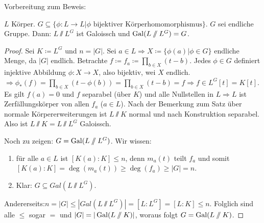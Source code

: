 \documentclass[12pt,a4paper]{scrartcl}
\begin{document}
\noindent Vorbereitung zum Beweis:
\begin{satz}\label{thm:22.2}
	$L$ Körper. $G\subseteq \{\phi\colon L\to L|\phi\text{ bijektiver Körperhomomorphismus}\}$. $G$ sei endliche Gruppe. Dann: $L\sslash L^G$ ist Galoissch und $\operatorname{Gal}(L\sslash L^G) = G$. 
\end{satz}
\begin{proof}
	Sei $K\coloneqq L^G$ und $n = |G|$. Sei $a\in L\Rightarrow X\coloneqq\{\phi(a)|\phi\in G\}$ endliche Menge, da $|G|$ endlich. Betrachte $f\coloneqq f_a\coloneqq  \prod_{b\in X}(t-b)$. Jedes $\phi\in G$ definiert injektive Abbildung $\phi\colon X\to X$, also bijektiv, wei $X$ endlich. $\Rightarrow \phi_*(f) = \prod_{b\in X} (t-\phi(b)) =\prod_{b\in X}(t-b) = f \Rightarrow f\in L^G[t] = K[t]$. Es gilt $f(a) = 0$ und $f$ separabel (über $K$) und alle Nullstellen in $L\Rightarrow L$ ist Zerfällungskörper von allen $f_a$ ($a\in L$).
	Nach der Bemerkung zum  Satz über normale Körpererweiterungen ist $L\sslash K$ normal und nach Konstruktion separabel. Also ist $L\sslash K = L\sslash L^G$ Galoissch.
	
	Noch zu zeigen: $G = \operatorname{Gal}(L\sslash L^G)$. Wir wissen:
	\begin{enumerate}
		\item  für alle $a\in L$ ist $[K(a):K]\leq n$, denn $m_a(t)$ teilt $f_a$ und somit $[K(a):K] = \deg(m_a(t))\geq \deg(f_a)\geq |G| = n$.
		\item Klar: $G\subseteq Gal(L\sslash L^G)$. 
	\end{enumerate}
	Andererseits:$n = |G|\leq |Gal(L\sslash L^G)| = [L:L^G] = [L:K]\leq n$. Folglich sind alle $\leq$ sogar $=$ und $|G| = |\operatorname{Gal}(L\sslash K)|$, woraus folgt $G = \operatorname{Gal}(L\sslash K)$.
\end{proof}
\end{document}
